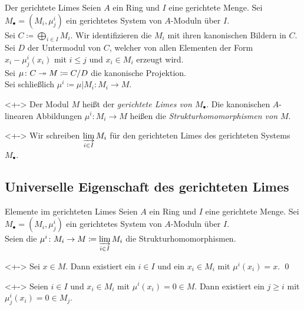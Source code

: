 \begin{frame}{Der gerichtete Limes}
	Seien \(A\) ein Ring und \(I\) eine gerichtete Menge. Sei \(M_\bullet
	= (M_i, \mu^i_j)\) ein gerichtetes System von \(A\)-Moduln über \(I\).
	\\
	Sei \(C \coloneqq \bigoplus\limits_{i \in I} M_i\). Wir identifizieren die
	\(M_i\) mit ihren kanonischen Bildern in \(C\).
	Sei \(D\) der Untermodul von \(C\), welcher von allen Elementen der Form
	\(x_i - \mu^i_j(x_i)\) mit \(i \le j\) und \(x_i \in M_i\) erzeugt wird.
	\\
	Sei \(\mu\colon C \twoheadrightarrow M \coloneqq C/D\) die kanonische Projektion.
	\\
	Sei schließlich \(\mu^i \coloneqq \mu|M_i\colon M_i \to M\).
	\begin{definition}<+->
		Der Modul \(M\) heißt der \emph{gerichtete Limes von \(M_\bullet\)}. Die
		kanonischen \(A\)-linearen Abbildungen \(\mu^i\colon M_i \to M\) heißen
		die \emph{Strukturhomomorphismen von \(M\)}.
	\end{definition}
	\begin{notation}<+->
		Wir schreiben \(\varinjlim\limits_{i \in I} M_i\) für den
		gerichteten Limes des gerichteten Systems \(M_\bullet\).
	\end{notation}
\end{frame}

\subsection{Universelle Eigenschaft des gerichteten Limes}

\begin{frame}{Elemente im gerichteten Limes}
	Seien \(A\) ein Ring und \(I\) eine gerichtete Menge. Sei
	\(M_\bullet = (M_i, \mu^i_j)\) ein gerichtetes System von \(A\)-Moduln über
	\(I\).
	\\
	Seien die \(\mu^i\colon M_i \to M \coloneqq \varinjlim\limits_{i \in I} M_i\) die
	Strukturhomomorphismen.
	\begin{proposition}<+->
		Sei \(x \in M\).
		Dann existiert ein \(i \in I\) und ein \(x_i \in M_i\)
		mit \(\mu^i(x_i) = x\).
		\qed
	\end{proposition}
	\begin{proposition}<+->
		Seien \(i \in I\) und \(x_i \in M_i\) mit \(\mu^i(x_i) = 0 \in M\).
		Dann existiert ein \(j \ge i\) mit \(\mu^i_j(x_i) = 0 \in M_j\).
	\end{proposition}
\end{frame}

